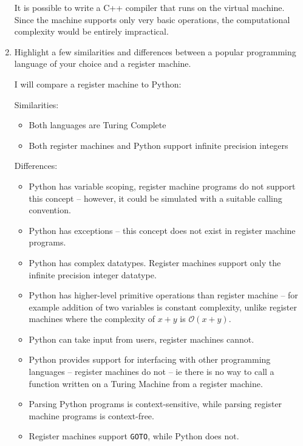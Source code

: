 \documentclass[10pt,\jkfside,a4paper]{article}
\begin{document}
\begin{enumerate}[label=(\alph*)]
It is possible to write a C++ compiler that runs on the virtual machine.
Since the machine supports only very basic operations, the computational
complexity would be entirely impractical.

\item Highlight a few similarities and differences between a popular
programming language of your choice and a register machine.

I will compare a register machine to Python:

Similarities:
\begin{itemize}

\item Both languages are Turing Complete

\item Both register machines and Python support infinite precision integers

\end{itemize}

Differences:
\begin{itemize}

\item Python has variable scoping, register machine programs do not support
this concept -- however, it could be simulated with a suitable calling
convention.

\item Python has exceptions -- this concept does not exist in register
machine programs.

\item Python has complex datatypes. Register machines support only the
infinite precision integer datatype.

\item Python has higher-level primitive operations than register machine --
for example addition of two variables is constant complexity, unlike register
machines where the complexity of $x + y$ is $\mathcal{O}(x + y)$.

\item Python can take input from users, register machines cannot.

\item Python provides support for interfacing with other programming
languages -- register machines do not -- ie there is no way to call a
function written on a Turing Machine from a register machine.

\item Parsing Python programs is context-sensitive, while parsing register
machine programs is context-free.

\item Register machines support \texttt{GOTO}, while Python does not.

\end{itemize}

\end{enumerate}
\end{document}
